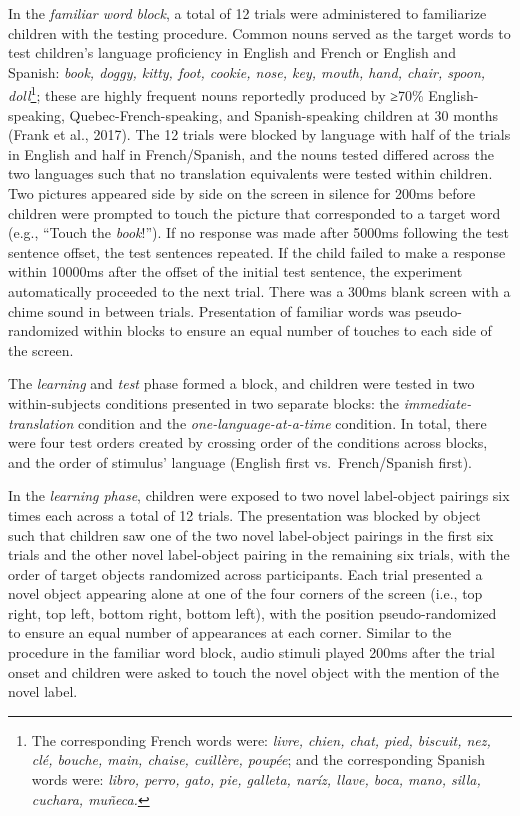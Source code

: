 \documentclass[
  man,floatsintext]{apa7}
\begin{document}
In the \emph{familiar word block}, a total of 12 trials were administered to familiarize children with the testing procedure. Common nouns served as the target words to test children's language proficiency in English and French or English and Spanish: \emph{book, doggy, kitty, foot, cookie, nose, key, mouth, hand, chair, spoon, doll}\footnote{The corresponding French words were: \emph{livre, chien, chat, pied, biscuit, nez, clé, bouche, main, chaise, cuillère, poupée}; and the corresponding Spanish words were: \emph{libro, perro, gato, pie, galleta, naríz, llave, boca, mano, silla, cuchara, muñeca.}}; these are highly frequent nouns reportedly produced by ≥70\% English-speaking, Quebec-French-speaking, and Spanish-speaking children at 30 months (Frank et al., 2017). The 12 trials were blocked by language with half of the trials in English and half in French/Spanish, and the nouns tested differed across the two languages such that no translation equivalents were tested within children. Two pictures appeared side by side on the screen in silence for 200ms before children were prompted to touch the picture that corresponded to a target word (e.g., ``Touch the \emph{book}!''). If no response was made after 5000ms following the test sentence offset, the test sentences repeated. If the child failed to make a response within 10000ms after the offset of the initial test sentence, the experiment automatically proceeded to the next trial. There was a 300ms blank screen with a chime sound in between trials. Presentation of familiar words was pseudo-randomized within blocks to ensure an equal number of touches to each side of the screen.

The \emph{learning} and \emph{test} phase formed a block, and children were tested in two within-subjects conditions presented in two separate blocks: the \emph{immediate-translation} condition and the \emph{one-language-at-a-time} condition. In total, there were four test orders created by crossing order of the conditions across blocks, and the order of stimulus' language (English first vs.~French/Spanish first).

In the \emph{learning phase}, children were exposed to two novel label-object pairings six times each across a total of 12 trials. The presentation was blocked by object such that children saw one of the two novel label-object pairings in the first six trials and the other novel label-object pairing in the remaining six trials, with the order of target objects randomized across participants. Each trial presented a novel object appearing alone at one of the four corners of the screen (i.e., top right, top left, bottom right, bottom left), with the position pseudo-randomized to ensure an equal number of appearances at each corner. Similar to the procedure in the familiar word block, audio stimuli played 200ms after the trial onset and children were asked to touch the novel object with the mention of the novel label.
\end{document}

